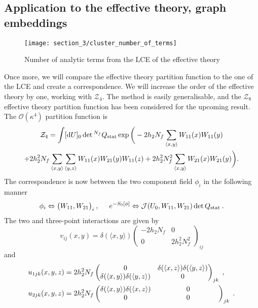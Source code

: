\subsection{Application to the effective theory, graph embeddings}

\begin{figure}[t]
  {\centering
    \texttt{[image: section\_3/cluster\_number\_of\_terms]}\par}
  \caption{Number of analytic terms from the LCE of the effective theory}
  \label{fig:cluster_num_terms}
\end{figure}

Once more, we will compare the effective theory partition function to the one of
the LCE and create a correspondence. We will increase the order of the effective
theory by one, working with $\mathcal{Z}_4$. The method is easily
generalisable, and the $\mathcal{Z}_8$ effective theory partition function has
been considered for the upcoming result. The $\mathcal{O}(\kappa^4)$ partition
function is
%
\begin{multline}
  \mathcal{Z}_4 = \int [ \mathrm{d} U ]_0 \det{}^{N_f} Q_{\text{stat}} \exp \bigg(-2
    h_2 N_f \sum_{\langle x,y \rangle} W_{11} (x) W_{11} (y)\\
  + 2 h_2^2 N_f \sum_{\langle x,y \rangle} \sum_{\langle y,z \rangle} W_{11}(x)
    W_{21}(y) W_{11}(z)
  + 2 h_2^2 N_f^2 \sum_{\langle x,y \rangle} W_{21}(x) W_{21}(y) \bigg).
\end{multline}
%
The correspondence is now between the two component field $\phi_i$ in the
following manner
%
\begin{equation}
  \phi_i \Leftrightarrow \big(W_{11}, W_{21}\big)_i\:, \hskip .5cm
  e^{-S_0[\phi]} \Leftrightarrow \mathcal{J} (U_0, W_{11}, W_{21}) \det Q_{\text{stat}}
  \:.
\end{equation}
%
The two and three-point interactions are given by
%
\begin{equation}
  v_{ij}(x,y) = \delta(\langle x,y \rangle)
    \begin{pmatrix}
      -2 h_2 N_f & 0 \\
      0 & 2 h_2^2 N_f^2
    \end{pmatrix}_{ij}
\end{equation}
%
and
%
\begin{align}
  u_{1jk}(x,y,z) &= 2 h_2^2 N_f 
    \begin{pmatrix}
      0 & \delta(\langle x,z \rangle) \delta(\langle y,z \rangle) \\
      \delta(\langle x,y \rangle) \delta(\langle y,z \rangle) & 0
    \end{pmatrix}_{jk} \;,\\
  u_{2jk}(x,y,z) &= 2 h_2^2 N_f  
  \begin{pmatrix}
    \delta(\langle x,y \rangle) \delta(\langle x,z \rangle) & 0 \\
    0 & \makebox[3cm][c]{$0$}
  \end{pmatrix}_{jk}\;.
\end{align}
